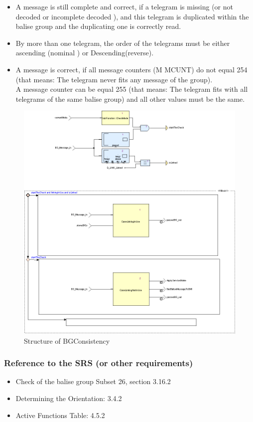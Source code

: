 \documentclass{template/openetcs_report}
\begin{document}
\begin{itemize}
\item A message is still complete and correct, if a telegram is missing (or not decoded or incomplete decoded ), and this telegram is duplicated within the balise group and the duplicating one is correctly read.
\item By more than one telegram, the order of the telegrams must be either ascending (nominal ) or Descending(reverse).\\
\item A message is correct, if  all message counters (M MCUNT) do not equal 254 (that means: The telegram never fits any message of the group).\\ A message counter can be equal 255 (that means: The telegram fits with all telegrams of the same balise group) and all other values must be the same.\\
\end{itemize}

\begin{figure}[ht]
\centering
\includegraphics[width=\textwidth]{../images/BGConsistency.png}
\caption{Structure of BGConsistency}
\end{figure}
\subsubsection{Reference to the SRS (or other requirements)}
\begin{itemize}
\item Check of the balise group Subset 26, section 3.16.2\\
\item Determining the Orientation: 3.4.2\\
\item  Active Functions Table: 4.5.2\\

\end{itemize}
\end{document}
